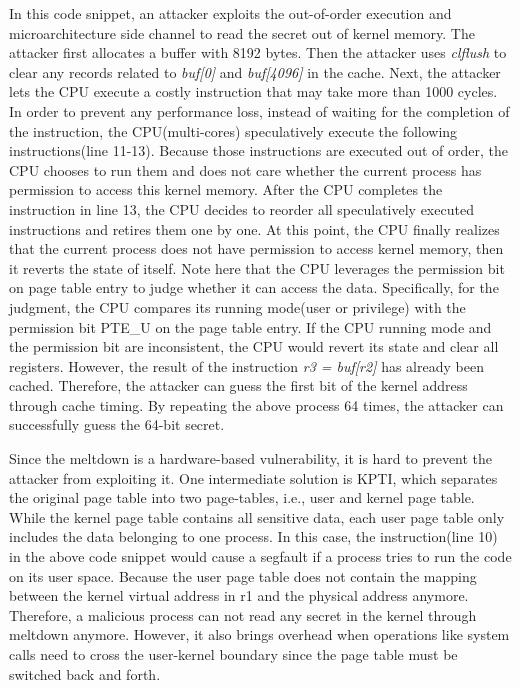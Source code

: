 In this code snippet, an attacker exploits the out-of-order execution and 
microarchitecture side channel to read the secret out of kernel memory. 
The attacker first allocates a buffer with 8192 bytes. Then the attacker uses 
\emph{clflush} to clear any records related to \emph{buf[0]} and \emph{buf[4096]} in the cache. 
Next, the attacker lets the CPU execute a costly instruction that may take more than 1000 cycles. 
In order to prevent any performance loss, instead of waiting for the completion of the instruction,  
the CPU(multi-cores) speculatively execute the following instructions(line 11-13). 
Because those instructions are executed out of order, the CPU chooses to run them and does 
not care whether the current process has permission to access this kernel memory. 
After the CPU completes the instruction in line 13, the CPU decides to reorder all speculatively 
executed instructions and retires them one by one. At this point, the CPU finally 
realizes that the current process does not have permission to access kernel memory, then it reverts the state of itself.
Note here that the CPU leverages the permission bit on page table entry to judge whether 
it can access the data. Specifically, for the judgment, the CPU compares its running 
mode(user or privilege) with the permission bit PTE\_U on the page table entry. 
If the CPU running mode and the permission bit are inconsistent, the CPU would revert 
its state and clear all registers.
However, the result of the instruction \emph{r3 = buf[r2]} has already been cached. Therefore, 
the attacker can guess the first bit of the kernel address through cache timing\cite{11}. 
By repeating the above process 64 times, the attacker can successfully guess the 64-bit secret.

Since the meltdown is a hardware-based vulnerability, it is hard to prevent the attacker 
from exploiting it. One intermediate solution is KPTI\cite{2}, which separates the original page 
table into two page-tables, i.e., user and kernel page table.  While the kernel page table 
contains all sensitive data, each user page table only includes the data belonging to one process. 
In this case, the instruction(line 10) in the above code snippet would cause a segfault if 
a process tries to run the code on its user space. Because the user page table does not contain 
the mapping between the kernel virtual address in r1 and the physical address anymore. Therefore, 
a malicious process can not read any secret in the kernel through meltdown anymore. However, 
it also brings overhead when operations like system calls need to cross the user-kernel boundary 
since the page table must be switched back and forth.

